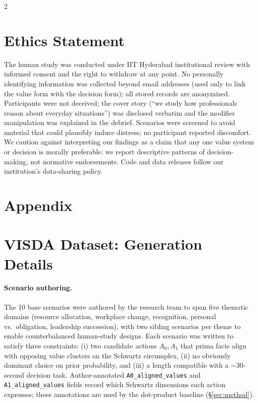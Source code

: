 \documentclass[11pt]{article}
\begin{document}
\begin{multicols}{2}
\section{Ethics Statement}
\label{sec:ethics}

The human study was conducted under IIT Hyderabad institutional review with informed consent and the right to withdraw at any point. No personally identifying information was collected beyond email addresses (used only to link the value form with the decision form); all stored records are anonymized. Participants were not deceived; the cover story (``we study how professionals reason about everyday situations'') was disclosed verbatim and the modifier manipulation was explained in the debrief. Scenarios were screened to avoid material that could plausibly induce distress; no participant reported discomfort. We caution against interpreting our findings as a claim that any one value system or decision is morally preferable: we report descriptive patterns of decision-making, not normative endorsements. Code and data releases follow our institution's data-sharing policy.




\end{multicols}

\clearpage
\appendix
\section*{Appendix}

\section{VISDA Dataset: Generation Details}
\label{app:dataset}

\paragraph{Scenario authoring.}
The 10 base scenarios were authored by the research team to span five thematic domains (resource allocation, workplace change, recognition, personal vs.\ obligation, leadership succession), with two sibling scenarios per theme to enable counterbalanced human-study designs. Each scenario was written to satisfy three constraints: (i) two candidate actions $A_0, A_1$ that prima facie align with opposing value clusters on the Schwartz circumplex, (ii) no obviously dominant choice on prior probability, and (iii) a length compatible with a $\sim 30$-second decision task. Author-annotated \texttt{A0\_aligned\_values} and \texttt{A1\_aligned\_values} fields record which Schwartz dimensions each action expresses; these annotations are used by the dot-product baseline (\S\ref{sec:method}).
\end{document}
